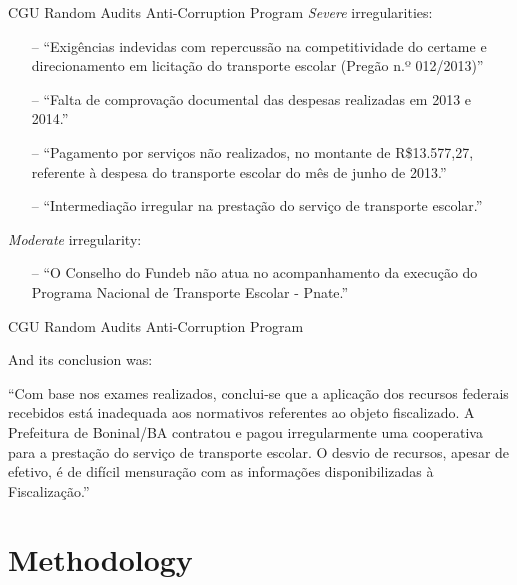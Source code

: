 \documentclass[handout,t,usenames,dvipsnames]{beamer}
\begin{document}
\begin{frame}{CGU Random Audits Anti-Corruption Program}
\vspace{1em}
\small
\textit{Severe} irregularities:
\begin{itemize}
\justifying
    \item[--]``Exigências indevidas com repercussão na competitividade do certame e direcionamento em licitação do transporte escolar (Pregão n.º 012/2013)''
    \item[--]``Falta de comprovação documental das despesas realizadas em 2013 e 2014.''
    \item[--]``Pagamento por serviços não realizados, no montante de R\$13.577,27, referente à despesa do transporte escolar do mês de junho de 2013.''
    \item[--]``Intermediação irregular na prestação do serviço de transporte escolar.''
\end{itemize}
\textit{Moderate} irregularity:
\begin{itemize}
    \item[--]``O Conselho do Fundeb não atua no acompanhamento da execução do Programa Nacional de Transporte Escolar - Pnate.''
\end{itemize}
\end{frame}

\begin{frame}{CGU Random Audits Anti-Corruption Program}
\vspace{1em}
\onehalfspacing
\justifying

And its conclusion was:
\vspace{1em}

``Com base nos exames realizados, conclui-se que a aplicação dos recursos federais recebidos está inadequada aos normativos referentes ao objeto fiscalizado. A Prefeitura de Boninal/BA contratou e pagou irregularmente uma cooperativa para a prestação do serviço de transporte escolar. O desvio de recursos, apesar de efetivo, é de difícil mensuração com as informações disponibilizadas à Fiscalização.''
\end{frame}




\section{Methodology}
\end{document}
